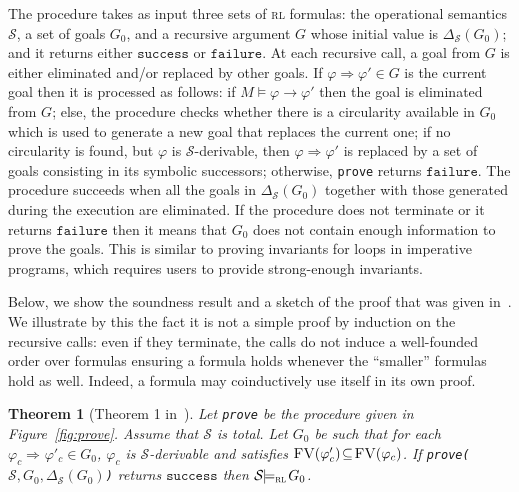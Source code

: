 \documentclass[conference]{IEEEtran}
\newenvironment{todo}{\medskip\hrule\smallskip\noindent}{\smallskip\hrule\medskip}
\newcommand{\dl}[1]{\begin{todo}\textcolor{blue}{Dorel:}\\ \color{red}{#1}\color{black}\end{todo}}
\newcommand{\vr}[1]{\begin{todo}\textcolor{blue}{Vlad:}\\ \color{orange}{#1}\color{black}\end{todo}}
\newcommand{\dl}[1]{}
\newcommand{\vr}[1]{}
\renewcommand{\S}{\mathcal{S}}
\newcommand{\tran}[2]{\Ra^{\!#1}_{\!#2}}
\newcommand{\failure}{\mathtt{failure}}
\newcommand{\success}{\mathtt{success}}
\newcommand{\Ra}{\Rightarrow}
\newcommand{\FreeVars}{\mathit{\textsc{FV}}}
\renewcommand{\implies}{\rightarrow}
\newcommand{\RL}{\textsc{rl}\xspace}
\newcommand{\rarule}[2]{{#1} \Ra{#2}}
\newcommand{\modelsrl}{\models_\RL}
\newtheorem{theorem}{Theorem}
\begin{document}
The procedure takes as input three sets of \RL formulas:
the operational semantics $\S$, a set of goals $G_0$, and a recursive argument $G$ whose initial value is $\Delta_\S(G_0)$; and it returns either $\success$ or $\failure$.
At each recursive call, a goal from $G$ is either eliminated and/or replaced by other goals. 
If $\rarule{\varphi}{\varphi'} \in G$ is the current goal then it is processed as follows: if $M\models \varphi \implies \varphi'$ then the goal is eliminated from $G$; else, the procedure checks whether there is a circularity available in $G_0$ which is used to generate a new goal that replaces the current one; if no circularity is found, but $\varphi$ is $\S$-derivable,  then $\rarule{\varphi}{\varphi'}$ is replaced by a set of goals consisting in its symbolic successors; otherwise,  \texttt{prove} returns $\failure$. 
The procedure succeeds when all the goals in $\Delta_\S(G_0)$ together with those generated during the execution are eliminated.
If the procedure does not terminate or it returns $\failure$ then it means that $G_0$ does not contain enough information to prove the goals. 
This is similar to proving invariants for loops in imperative programs, which requires users to provide strong-enough invariants.


Below, we show the soundness result and a sketch of the proof that was given in~\cite{lucanu-rusu-arusoaie-nowak-LRC2015}.
We illustrate by this the fact it is not a simple proof by induction on the recursive calls:
even if they terminate, the calls do not induce a well-founded order over formulas ensuring a formula holds whenever the ``smaller'' formulas hold as well.
Indeed, a formula may coinductively use itself in its own proof.



\begin{theorem}[Theorem 1 in~\cite{lucanu-rusu-arusoaie-nowak-LRC2015}]
\label{th:sound}
Let {\tt{prove}} be the procedure given in Figure~\ref{fig:prove}.
Assume that $\S$ is total.
Let \!$G_0$\! be such that for each $\varphi_c\!\!\tran{}{}\!\!\varphi'_c \!\in\!G_0$, $\varphi_c$ is $\S$-derivable and satisfies \!$\FreeVars(\varphi'_c)\!\subseteq\!\FreeVars(\varphi_c)$.
If {\tt prove(}$\S\!,  G_0, \Delta_\S(G_0)${\tt )} returns  $\success$ then \!$\S\!\!\modelsrl\!G_0$.
\end{theorem}
\end{document}
